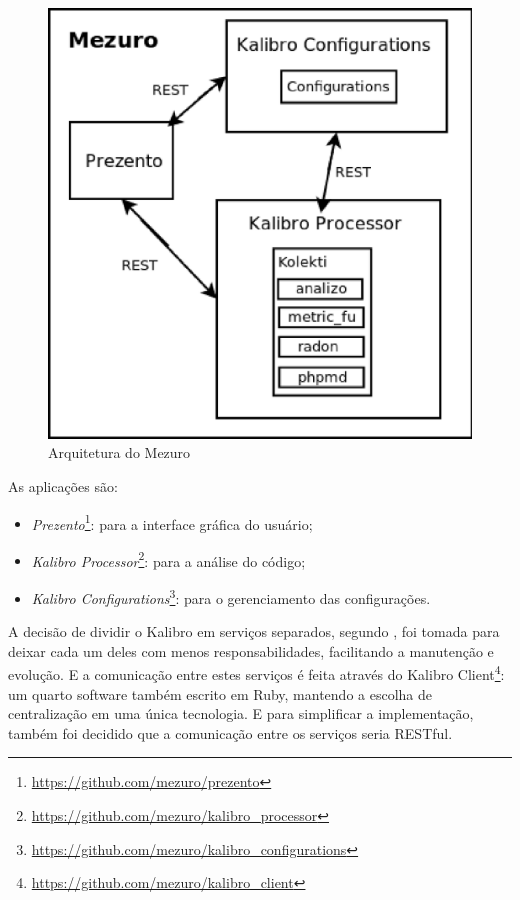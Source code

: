 \begin{figure}[!htb]
	\centering
    \includegraphics[keepaspectratio=true,scale=0.5]
    {figuras/mezuro_arch_v2.eps}
  \caption{Arquitetura do Mezuro}
	\label{fig:mezuro_arch_v2}
\end{figure}

As aplicações são:

\begin{itemize}
  \item \textit{Prezento}\footnote{\url{https://github.com/mezuro/prezento}}:
        para a interface gráfica do usuário;
  \item \textit{Kalibro Processor}\footnote{\url{https://github.com/mezuro/kalibro\_processor}}:
        para a análise do código;
  \item \textit{Kalibro Configurations}\footnote{\url{https://github.com/mezuro/kalibro\_configurations}}:
        para o gerenciamento das configurações.
\end{itemize}

A decisão de dividir o Kalibro em serviços separados, segundo
, foi tomada para deixar
cada um deles com menos responsabilidades, facilitando a manutenção e evolução.
E a comunicação entre estes serviços é feita através
do Kalibro Client\footnote{\url{https://github.com/mezuro/kalibro\_client}}:
um quarto software também escrito em Ruby, mantendo a escolha de centralização
em uma única tecnologia. E para simplificar a implementação, também foi decidido
que a comunicação entre os serviços seria RESTful.

